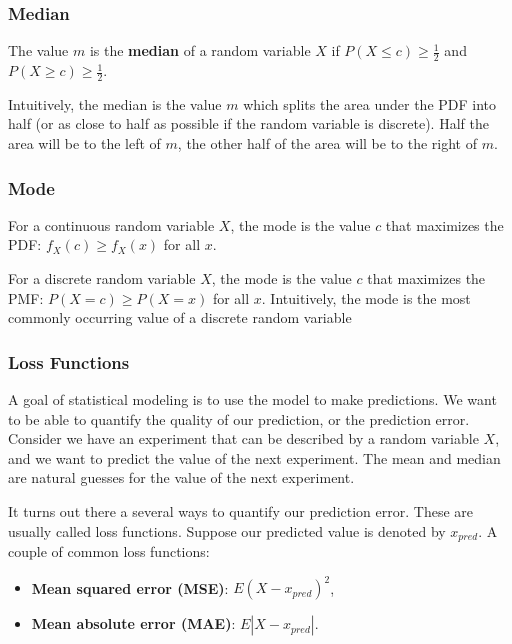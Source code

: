 \documentclass[
]{book}
\providecommand{\tightlist}{%
  \setlength{\itemsep}{0pt}\setlength{\parskip}{0pt}}
\begin{document}
\subsubsection{Median}\label{median-1}

The value \(m\) is the \textbf{median} of a random variable \(X\) if \(P(X \leq c) \geq \frac{1}{2}\) and \(P(X \geq c) \geq \frac{1}{2}\).

Intuitively, the median is the value \(m\) which splits the area under the PDF into half (or as close to half as possible if the random variable is discrete). Half the area will be to the left of \(m\), the other half of the area will be to the right of \(m\).

\subsubsection{Mode}\label{mode-1}

For a continuous random variable \(X\), the mode is the value \(c\) that maximizes the PDF: \(f_X(c) \geq f_X(x)\) for all \(x\).

For a discrete random variable \(X\), the mode is the value \(c\) that maximizes the PMF: \(P(X=c) \geq P(X=x)\) for all \(x\). Intuitively, the mode is the most commonly occurring value of a discrete random variable

\subsubsection{Loss Functions}\label{loss-functions}

A goal of statistical modeling is to use the model to make predictions. We want to be able to quantify the quality of our prediction, or the prediction error. Consider we have an experiment that can be described by a random variable \(X\), and we want to predict the value of the next experiment. The mean and median are natural guesses for the value of the next experiment.

It turns out there a several ways to quantify our prediction error. These are usually called loss functions. Suppose our predicted value is denoted by \(x_{pred}\). A couple of common loss functions:

\begin{itemize}
\tightlist
\item
  \textbf{Mean squared error (MSE)}: \(E(X-x_{pred})^2\),
\item
  \textbf{Mean absolute error (MAE)}: \(E|X-x_{pred}|\).
\end{itemize}
\end{document}
